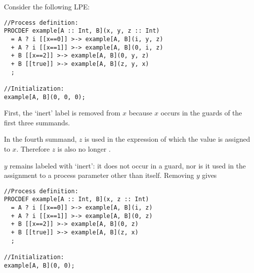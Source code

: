 Consider the following LPE:

\begin{lstlisting}
//Process definition:
PROCDEF example[A :: Int, B](x, y, z :: Int)
  = A ? i [[x==0]] >-> example[A, B](i, y, z)
  + A ? i [[x==1]] >-> example[A, B](0, i, z)
  + B [[x==2]] >-> example[A, B](0, y, z)
  + B [[true]] >-> example[A, B](z, y, x)
  ;

//Initialization:
example[A, B](0, 0, 0);
\end{lstlisting}

First, the `inert' label is removed from $x$ because $x$ occurs in the guards of the first three summands.

In the fourth summand, $z$ is used in the expression of which the value is assigned to $x$.
Therefore $z$ is also no longer .

$y$ remains labeled with `inert': it does not occur in a guard, nor is it used in the assignment to a process parameter other than itself.
Removing $y$ gives

\begin{lstlisting}
//Process definition:
PROCDEF example[A :: Int, B](x, z :: Int)
  = A ? i [[x==0]] >-> example[A, B](i, z)
  + A ? i [[x==1]] >-> example[A, B](0, z)
  + B [[x==2]] >-> example[A, B](0, z)
  + B [[true]] >-> example[A, B](z, x)
  ;

//Initialization:
example[A, B](0, 0);
\end{lstlisting}



